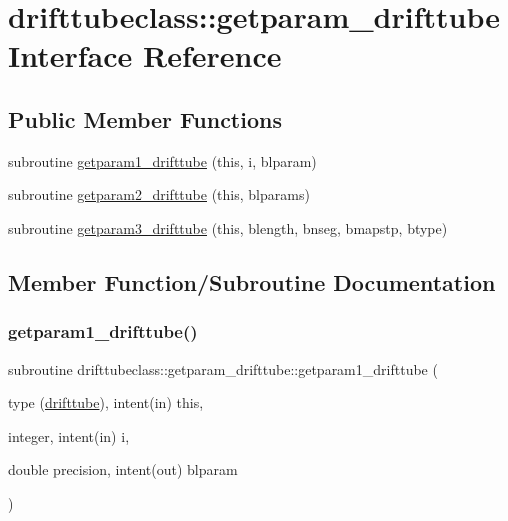 \hypertarget{interfacedrifttubeclass_1_1getparam__drifttube}{}\section{drifttubeclass\+::getparam\+\_\+drifttube Interface Reference}
\label{interfacedrifttubeclass_1_1getparam__drifttube}
\subsection*{Public Member Functions}
\begin{DoxyCompactItemize}
\item 
subroutine \mbox{\hyperlink{interfacedrifttubeclass_1_1getparam__drifttube_a0af4be1672ba1910d4bb7df2c6b255bf}{getparam1\+\_\+drifttube}} (this, i, blparam)
\item 
subroutine \mbox{\hyperlink{interfacedrifttubeclass_1_1getparam__drifttube_ae79a1715b3b9935b7756cb0c0335bc33}{getparam2\+\_\+drifttube}} (this, blparams)
\item 
subroutine \mbox{\hyperlink{interfacedrifttubeclass_1_1getparam__drifttube_a7f0f10f4302e2b8c7d0f539bfbc634ad}{getparam3\+\_\+drifttube}} (this, blength, bnseg, bmapstp, btype)
\end{DoxyCompactItemize}


\subsection{Member Function/\+Subroutine Documentation}
\mbox{\label{interfacedrifttubeclass_1_1getparam__drifttube_a0af4be1672ba1910d4bb7df2c6b255bf}} 
\subsubsection{\texorpdfstring{getparam1\_drifttube()}{getparam1\_drifttube()}}
{\footnotesize\ttfamily subroutine drifttubeclass\+::getparam\+\_\+drifttube\+::getparam1\+\_\+drifttube (\begin{DoxyParamCaption}\item[{type (\mbox{\hyperlink{namespacedrifttubeclass_structdrifttubeclass_1_1drifttube}{drifttube}}), intent(in)}]{this,  }\item[{integer, intent(in)}]{i,  }\item[{double precision, intent(out)}]{blparam }\end{DoxyParamCaption})}

